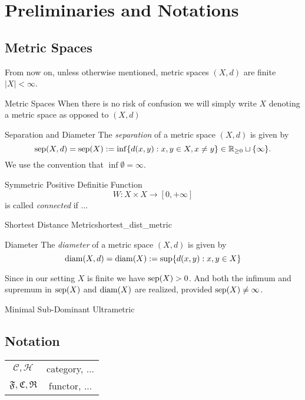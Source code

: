 \chapter{Preliminaries and Notations}

\section{Metric Spaces}
From now on, unless otherwise mentioned, \todo[is it ever?] metric spaces $(X,d)$ are finite \ie\ $|X| < \infty$.

\begin{notation}{Metric Spaces}{}
When there is no risk of confusion we will simply write $X$ denoting a metric space as opposed to $(X,d)$
\end{notation}

\begin{definition}{Separation and Diameter}{}
The \emph{separation} of a metric space $(X,d)$ is given by
\begin{equation*}
\mathrm{sep}(X,d) = \mathrm{sep}(X) := \inf\{d(x,y): x,y \in X, x \neq y\} \in \mathbb R_{\geq 0} \sqcup \{\infty\}.
\end{equation*}
We use the convention that $\inf \emptyset = \infty$.
\end{definition}

\begin{definition}{Symmetric Positive Definitie Function}{}
$$
W: X \times X \to [0, +\infty]
$$
is called \emph{connected} if ...
\end{definition}

\begin{definition}{Shortest Distance Metric}{shortest_dist_metric}
\end{definition}

\begin{definition}{Diameter}{}
The \emph{diameter} of a metric space $(X,d)$ is given by
\begin{equation*}
\mathrm{diam}(X,d) = \mathrm{diam}(X) := \sup\{d(x,y): x,y \in X\}
\end{equation*}
\end{definition}

\begin{myremark}{}{}
Since in our setting $X$ is finite we have $\mathrm{sep}(X) > 0$. And both the infimum and supremum in $\mathrm{sep}(X)$ and $\mathrm{diam}(X)$ are realized, provided $\mathrm{sep}(X) \neq \infty$.
\end{myremark}

\begin{defprop}{Minimal Sub-Dominant Ultrametric}{}
\end{defprop}

\section{Notation}
\begin{tabular}{c c}
    $\mathcal{C,H}$ & category, ... \\
    $\mathfrak{F,C,R}$ & functor, ... \\ 
\end{tabular}

